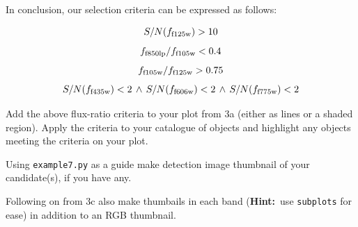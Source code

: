 \documentclass{article}
\newcommand{\hint}{\textbf{Hint:}}
\begin{document}
In conclusion, our selection criteria can be expressed as follows:

\[
S/N(f_{\rm f125w})>10
\]
\[
f_{\rm f850lp}/f_{\rm f105w}<0.4
\]
\[
f_{\rm f105w}/f_{\rm f125w}>0.75
\]
\[
S/N(f_{\rm f435w})<2\, \land\, S/N(f_{\rm f606w})<2\, \land\, S/N(f_{\rm f775w})<2
\]


\begin{question}
Add the above flux-ratio criteria to your plot from 3a (either as lines or a shaded region). Apply the criteria to your catalogue of objects and highlight any objects meeting the criteria on your plot.
\end{question}


\begin{question}
Using \texttt{example7.py} as a guide make detection image thumbnail of your candidate(s), if you have any.
\end{question}

\begin{question}
Following on from 3c also make thumbails in each band (\hint\ use \texttt{subplots} for ease) in addition to an RGB thumbnail.
\end{question}

\end{document}
